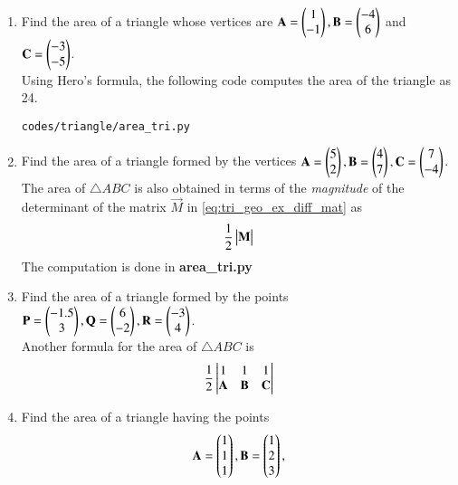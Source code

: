 \begin{enumerate}[label=\arabic*.,ref=\thesubsection.\theenumi]
%
%
\item Find the area of a triangle whose vertices are 
$\mathbf{A}=\begin{pmatrix}1\\-1\end{pmatrix}, 
\mathbf{B} = \begin{pmatrix}-4\\6\end{pmatrix}$ and
$ 
\mathbf{C} = \begin{pmatrix}-3\\-5\end{pmatrix}
$.
%
\\
\solution
  Using Hero's formula, the following code computes the area of the  triangle as 24.
%
\begin{lstlisting}
codes/triangle/area_tri.py
\end{lstlisting}
%
%
\item Find the area of a triangle formed by the vertices $\mathbf{A}=\begin{pmatrix}5\\2\end{pmatrix}, \mathbf{B}=\begin{pmatrix}4\\7\end{pmatrix}, \mathbf{C}=\begin{pmatrix}7\\-4\end{pmatrix}$.
\solution  The area of $\triangle ABC$ is also obtained  in terms of the  {\em magnitude} of the determinant of the matrix $\vec{M}$ in  \eqref{eq:tri_geo_ex_diff_mat} as
%
\begin{align}
\frac{1}{2}\begin{vmatrix}\mathbf{M}\end{vmatrix}
\end{align}
The computation is done in \textbf{area\_tri.py}
\item Find the area of a triangle formed by the points $\mathbf{P}=\begin{pmatrix}-1.5\\3\end{pmatrix}, \mathbf{Q}=\begin{pmatrix}6\\-2\end{pmatrix}, \mathbf{R}=\begin{pmatrix}-3\\4\end{pmatrix}$.
\\
\solution Another formula for the area of $\triangle ABC$  is
%
\begin{align}
\frac{1}{2}\begin{vmatrix}1 & 1 & 1\\ \mathbf{A} & \mathbf{B} & \mathbf{C} \end{vmatrix}
\end{align}
%
\item Find the area of a triangle having the points
%
\begin{align}
\vec{A} = \myvec{1\\1 \\1},
\vec{B} = \myvec{1\\2 \\3},

\end{align}
\end{enumerate}
